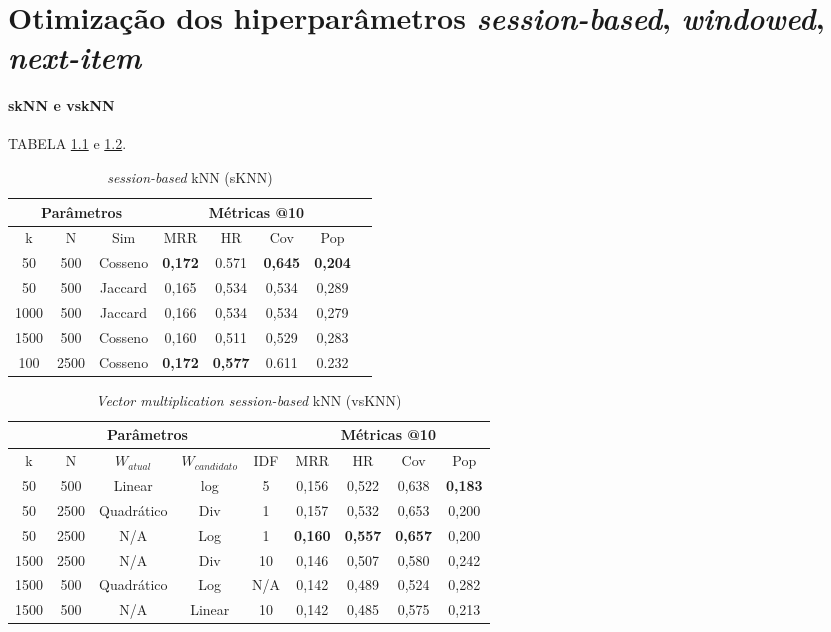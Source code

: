 \newpage

\chapter{Otimização dos hiperparâmetros \textit{session-based}, \textit{windowed}, \textit{next-item}}
\subsubsection{skNN e vskNN}
TABELA \ref{app:sknn2} e \ref{app:vsknn2}.
\begin{table}[htbp]
    \centering
    \begin{tabular}{|c|c|c|c|c|c|c|c|}
      \hline
      \multicolumn{3}{|c|}{Parâmetros} & \multicolumn{4}{c|}{Métricas @10} \\
      \hline
      k & N & Sim & MRR & HR & Cov & Pop\\
      \hline
      50 & 500 & Cosseno & \textbf{0,172} & 0.571 & \textbf{0,645} & \textbf{0,204} \\
      \hline
      50 & 500 & Jaccard & 0,165 & 0,534 & 0,534 & 0,289 \\
      \hline
      1000 & 500 & Jaccard & 0,166 & 0,534 & 0,534 & 0,279 \\
      \hline
      1500 & 500 & Cosseno & 0,160 & 0,511 & 0,529 & 0,283 \\
      \hline
      100 & 2500 & Cosseno & \textbf{0,172} & \textbf{0,577} & 0.611 & 0.232 \\
      \hline
    \end{tabular}
    \caption{\textit{session-based} kNN (sKNN)}
    \label{app:sknn2}
  \end{table}


\begin{table}[htbp]
\centering
  \begin{tabular}{|c|c|c|c|c|c|c|c|c|}
    \hline
    \multicolumn{5}{|c|}{Parâmetros} & \multicolumn{4}{c|}{Métricas @10} \\
    \hline
    k & N & $W_{atual}$ & $W_{candidato}$ & IDF & MRR & HR & Cov & Pop \\
    \hline
    50 & 500 & Linear & log & 5 & 0,156 & 0,522  & 0,638 & \textbf{0,183} \\
    \hline
    50 & 2500 & Quadrático & Div & 1 & 0,157 & 0,532 & 0,653 & 0,200 \\
    \hline
    50 & 2500 & N/A & Log & 1 & \textbf{0,160} & \textbf{0,557} & \textbf{0,657} & 0,200 \\
    \hline
    1500 & 2500 & N/A & Div & 10 & 0,146 & 0,507 & 0,580 & 0,242 \\
    \hline
    1500 & 500 & Quadrático & Log & N/A & 0,142 & 0,489 & 0,524 & 0,282 \\
    \hline
    1500 & 500 & N/A & Linear & 10 & 0,142 & 0,485 & 0,575 & 0,213 \\
    \hline
  \end{tabular}
  \caption{\textit{Vector multiplication session-based} kNN (vsKNN)}
  \label{app:vsknn2}
\end{table}

